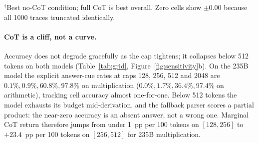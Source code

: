 \documentclass[11pt,a4paper]{article}
\begin{document}
\begin{table}[t]
\centering
\caption{Recovery grid: accuracy (\%) $\pm$ 95\% binomial interval, 0-shot,
$N{=}1000$ per cell. Bold marks the best condition in each row.}
\label{tab:grid}
\smallskip
{\footnotesize $^{\dagger}$Best no-CoT condition; full CoT is best overall. Zero
cells show $\pm0.00$ because all 1000 traces truncated identically.}
\end{table}

\paragraph{CoT is a cliff, not a curve.}
Accuracy does not degrade gracefully as the cap tightens; it collapses below 512
tokens on both models (Table~\ref{tab:grid}, Figure~\ref{fig:sensitivity}b). On
the 235B model the explicit answer-cue rates at caps 128, 256, 512 and 2048 are
$0.1\%,0.9\%,60.8\%,97.8\%$ on multiplication ($0.0\%,1.7\%,36.4\%,97.4\%$ on
arithmetic), tracking cell accuracy almost one-for-one. Below 512 tokens the model
exhausts its budget mid-derivation, and the fallback parser scores a partial
product: the near-zero accuracy is an absent answer, not a wrong one. Marginal CoT
return therefore jumps from under 1~pp per 100 tokens on $[128,256]$ to
$+23.4$~pp per 100 tokens on $[256,512]$ for 235B multiplication.
\end{document}
